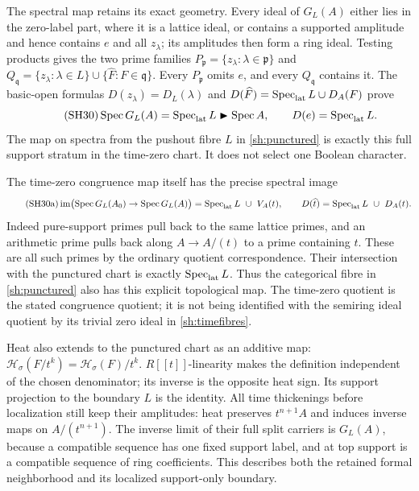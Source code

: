 \documentclass[11pt,a4paper]{article}
\theoremstyle{definition}\newtheorem{definition}[theorem]{Definition}
\newcommand{\Spec}{\operatorname{Spec}}\newcommand{\SpecMon}{\operatorname{Spec}_{\mathrm{mon}}}
\providecommand{\Ht}{\mathcal H}
\begin{document}
The spectral map retains its exact geometry. Every ideal of
$G_L(A)$ either lies in the zero-label part, where it is a
lattice ideal, or contains a supported amplitude and hence
contains $e$ and all $z_\lambda$; its amplitudes then form a
ring ideal. Testing products gives the two prime families
$P_{\mathfrak p}=\{z_\lambda:\lambda\in\mathfrak p\}$ and
$Q_{\mathfrak q}=\{z_\lambda:\lambda\in L\}
\cup\{\widehat F:F\in\mathfrak q\}$.
Every $P_{\mathfrak p}$ omits $e$, and every $Q_{\mathfrak q}$
contains it. The basic-open formulas
$D(z_\lambda)=D_L(\lambda)$ and
$D(\widehat F)=\Spec_{\rm lat}L\cup D_A(F)$ prove
\begin{equation}\tag{SH30}\label{sh:spectrum}
 \Spec G_L(A)=\Spec_{\rm lat}L\blacktriangleright\Spec A,\qquad
 D(e)=\Spec_{\rm lat}L.
\end{equation}
The map on spectra from the pushout fibre $L$ in
\eqref{sh:punctured} is exactly this full support stratum in
the time-zero chart. It does not select one Boolean character.

The time-zero congruence map itself has the precise spectral image
\begin{equation}\tag{SH30a}\label{sh:intersection}
 \im\bigl(\Spec G_L(A_0)\to\Spec G_L(A)\bigr)
   =\Spec_{\rm lat}L\ \cup\ V_A(t),\qquad
 D(\widehat t)=\Spec_{\rm lat}L\ \cup\ D_A(t).
\end{equation}
Indeed pure-support primes pull back to the same lattice primes,
and an arithmetic prime pulls back along $A\to A/(t)$ to a
prime containing $t$. These are all such primes by the ordinary
quotient correspondence. Their intersection with the punctured
chart is exactly $\Spec_{\rm lat}L$. Thus the categorical fibre
in \eqref{sh:punctured} also has this explicit topological map.
The time-zero quotient is the stated congruence quotient; it is
not being identified with the semiring ideal quotient by its
trivial zero ideal in \eqref{sh:timefibres}.

Heat also extends to the punctured chart as an additive map:
$\Ht_\sigma(F/t^k)=\Ht_\sigma(F)/t^k$.
$R[[t]]$-linearity makes the definition independent of the
chosen denominator; its inverse is the opposite heat sign.
Its support projection to the boundary $L$ is the identity.
All time thickenings before localization still keep their
amplitudes: heat preserves $t^{n+1}A$ and induces inverse maps
on $A/(t^{n+1})$. The inverse limit of their full split carriers
is $G_L(A)$, because a compatible sequence has one fixed
support label, and at top support is a compatible sequence
of ring coefficients. This describes both the retained formal
neighborhood and its localized support-only boundary.
\end{document}
